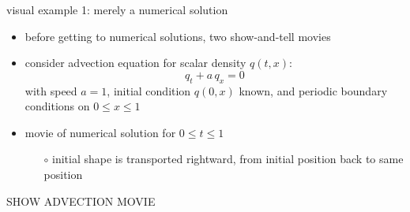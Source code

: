 \documentclass[10pt,dvipsnames,usepdftitle=false,
hyperref={pdftitle = {Finite volume methods},
    pdfauthor = {Ed Bueler}}]{beamer}
\begin{document}
\begin{frame}{visual example 1: merely a numerical solution}

\begin{itemize}
\item before getting to numerical solutions, two show-and-tell movies
\item consider advection equation for scalar density $q(t,x)$:
    $$q_t + a \, q_x = 0$$
with speed $a=1$, initial condition $q(0,x)$ known, and periodic boundary conditions on $0\le x \le 1$
\item movie of numerical solution for $0\le t \le 1$
    \begin{itemize}
    \item[$\circ$] initial shape is transported rightward, from initial position back to same position
    \end{itemize}
\end{itemize}

\vspace{10mm}
\begin{center}
\alert{SHOW ADVECTION MOVIE}
\end{center}
\vspace{10mm}

\end{frame}
\end{document}
